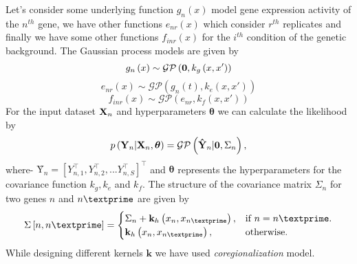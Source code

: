 Let's consider some underlying function $g_n\left(x\right)$ model gene expression activity of the $n^{th}$ gene, we have other functions $e_{nr}\left(x\right)$ which consider $r^{th}$ replicates and finally we have some other functions $f_{inr}\left(x\right)$ for the $i^{th}$ condition of the genetic background. The Gaussian process models are given by
\begin{equation} \label{eq:hGPn}
g_n\left(x\right) \sim \mathcal{GP} \left(\textbf 0,k_g\left(x,x' \right)\right)
\end{equation}
\begin{equation} \label{eq:hGPnr}
e_{nr}\left(x\right) \sim \mathcal{GP} \left(g_n\left(t\right),k_e\left(x,x' \right)\right)
\end{equation}
\begin{equation} \label{eq:hGPinr}
f_{inr}\left(x\right) \sim \mathcal{GP} \left(e_{nr},k_f\left(x,x' \right)\right)
\end{equation}
For the input dataset ${\textbf X}_n$ and hyperparameters $\boldsymbol{\theta}$ we can calculate the 
likelihood by
\begin{equation} \label{eq:LikelihoodHGP}
p\left(\textbf{Y}_n | \textbf{X}_n, \boldsymbol{\theta}\right) = \mathcal{GP} \left(\textbf {\^{Y}}_n|\textbf 0, \Sigma_n\right),
\end{equation}
where-
$\textbf {\^{Y}}_n= {\left[Y_{n,1}^\top,Y_{n,2}^\top, ... Y_{n,S}^\top\right]}^\top$ and $\boldsymbol{\theta}$ represents the hyperparameters for the covariance function $k_g,k_e$ and $k_f$. The structure of the covariance matrix $\Sigma_n$ for two genes $n$ and $n\textprime$ are given by
\begin{equation}
  \Sigma\left[n,n\textprime\right]=\begin{cases}
    \Sigma_n+\textbf{k}_h\left(x_n,x_{n\textprime}\right), & \text{if $n=n\textprime$}.\\
    \textbf{k}_h\left(x_n,x_{n\textprime}\right), & \text{otherwise}.
  \end{cases}
\end{equation}
While designing different kernels $\textbf{k}$ we have used \emph{coregionalization} model. 

